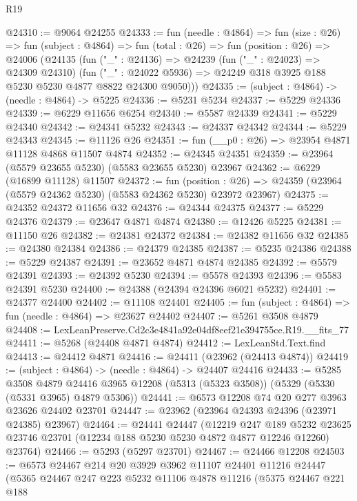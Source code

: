 \begin{lexlean}{R19}
\begin{coremodule}
@24310 := @9064 @24255
@24333 := fun (needle : @4864) =>
  fun (size : @26) =>
  fun (subject : @4864) =>
  fun (total : @26) =>
  fun (position : @26) =>
  @24006
    (@24135
      (fun ("_" : @24136) =>
      @24239
        (fun ("_" : @24023) => @24309 @24310)
        (fun ("_" : @24022 @5936) => @24249 @318 @3925 @188 @5230 @5230 @4877 @8822 @24300 @9050)))
@24335 := (subject : @4864) -> (needle : @4864) -> @5225
@24336 := @5231 @5234
@24337 := @5229 @24336
@24339 := @6229 @11656 @6254
@24340 := @5587 @24339
@24341 := @5229 @24340
@24342 := @24341 @5232
@24343 := @24337 @24342
@24344 := @5229 @24343
@24345 := @11126 @26
@24351 := fun (__p0 : @26) => @23954 @4871 @11128 @4868 @11507 @4874
@24352 := @24345 @24351
@24359 := @23964 (@5579 @23655 @5230) (@5583 @23655 @5230) @23967
@24362 := @6229 (@16899 @11128) @11507
@24372 := fun (position : @26) =>
  @24359 (@23964 (@5579 @24362 @5230) (@5583 @24362 @5230) @23972 @23967)
@24375 := @24352 @24372 @11656 @32
@24376 := @24344 @24375
@24377 := @5229 @24376
@24379 := @23647 @4871 @4874
@24380 := @12426 @5225
@24381 := @11150 @26
@24382 := @24381 @24372
@24384 := @24382 @11656 @32
@24385 := @24380 @24384
@24386 := @24379 @24385
@24387 := @5235 @24386
@24388 := @5229 @24387
@24391 := @23652 @4871 @4874 @24385
@24392 := @5579 @24391
@24393 := @24392 @5230
@24394 := @5578 @24393
@24396 := @5583 @24391 @5230
@24400 := @24388 (@24394 @24396 @6021 @5232)
@24401 := @24377 @24400
@24402 := @11108 @24401
@24405 := fun (subject : @4864) => fun (needle : @4864) => @23627 @24402
@24407 := @5261 @3508 @4879
@24408 := LexLeanPreserve.Cd2c3e4841a92e04df8eef21e394755ce.R19.__fits_77
@24411 := @5268 (@24408 @4871 @4874)
@24412 := LexLeanStd.Text.find
@24413 := @24412 @4871
@24416 := @24411 (@23962 (@24413 @4874))
@24419 := (subject : @4864) -> (needle : @4864) -> @24407 @24416
@24433 := @5285
    @3508
    @4879
    @24416
    @3965
    @12208
    (@5313 (@5323 @3508))
    (@5329 (@5330 (@5331 @3965) @4879 @5306))
@24441 := @6573 @12208 @74 @20 @277 @3963 @23626 @24402 @23701
@24447 := @23962 (@23964 @24393 @24396 (@23971 @24385) @23967)
@24464 := @24441
    @24447
    (@12219
      @247
      @189
      @5232
      @23625
      @23746
      @23701
      (@12234 @188 @5230 @5230 @4872 @4877 @12246 @12260)
      @23764)
@24466 := @5293 (@5297 @23701)
@24467 := @24466 @12208
@24503 := @6573
    @24467
    @214
    @20
    @3929
    @3962
    @11107
    @24401
    @11216
    @24447
    (@5365
      @24467
      @247
      @223
      @5232
      @11106
      @4878
      @11216
      (@5375
        @24467
        @221
        @188

\end{coremodule}
\end{lexlean}
